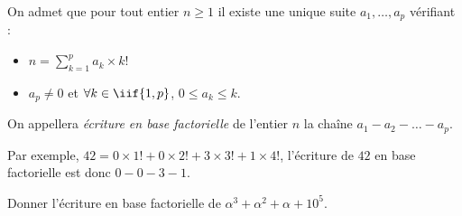On admet que pour tout entier $n\geq 1$ il existe une unique suite $a_1,\dots,a_p$ vérifiant : 
\begin{itemize}
    \item $n = \displaystyle\sum_{k=1}^p a_k\times k!$ 
    \item $a_p \neq 0$ et $\forall k \in \iif{1,p}$, $0 \leq a_k \leq k$.
\end{itemize}
On appellera \emph{écriture en base factorielle} de l'entier $n$ la chaîne $a_1-a_2-\dots-a_p$.

\medskip{}

Par exemple, $42 = 0\times 1! + 0 \times 2! + 3 \times 3! + 1 \times 4!$, l'écriture de $42$ en base factorielle est donc $0-0-3-1$. 

\medskip{}

\question{} Donner l'écriture en base factorielle de $\alpha^3+\alpha^2+\alpha + 10^5$.
